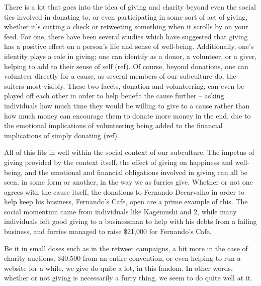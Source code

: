 There is a lot that goes into the idea of giving and charity beyond even the social ties involved in donating to, or even participating in some sort of act of giving, whether it's cutting a check or retweeting something when it scrolls by on your feed.  For one, there have been several studies which have suggested that giving has a positive effect on a person's life and sense of well-being.  Additionally, one's identity plays a role in giving; one can identify as a donor, a volunteer, or a giver, helping to add to their sense of self (ref).  Of course, beyond donations, one can volunteer directly for a cause, as several members of our subculture do, the suiters most visibly.  These two facets, donation and volunteering, can even be played off each other in order to help benefit the cause further -- asking individuals how much time they would be willing to give to a cause rather than how much money can encourage them to donate more money in the end, due to the emotional implications of volunteering being added to the financial implications of simply donating (ref).

All of this fits in well within the social context of our subculture.  The impetus of giving provided by the context itself, the effect of giving on happiness and well-being, and the emotional and financial obligations involved in giving can all be seen, in some form or another, in the way we as furries give.  Whether or not one agrees with the cause itself, the donations to Fernando Decarvalho in order to help keep his business, Fernando's Cafe, open are a prime example of this.  The social momentum came from individuals like Kagemushi and 2, while many individuals felt good giving to a businessman to help with his debts from a failing business, and furries managed to raise \$21,000 for Fernando's Cafe.

Be it in small doses such as in the retweet campaigns, a bit more in the case of charity auctions, \$40,500 from an entire convention, or even helping to run a website for a while, we give do quite a lot, in this fandom.  In other words, whether or not giving is necessarily a furry thing, we seem to do quite well at it.
